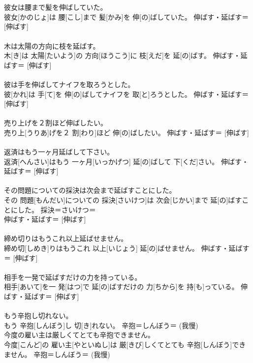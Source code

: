 \documentclass[8pt]{extreport}
\begin{document}
\begin{CJK}{UTF8}{min}
{\\	[晒す] 
\\	彼女は腰まで髪を伸ばしていた。	
\\	彼女[かのじょ]は 腰[こし]まで 髪[かみ]を 伸[の]ばしていた。	伸ばす・延ばす＝ [伸ばす] 
\\	[延ばす] 
\\	木は太陽の方向に枝を延ばす。	
\\	木[き]は 太陽[たいよう]の 方向[ほうこう]に 枝[えだ]を 延[の]ばす。	伸ばす・延ばす＝ [伸ばす] 
\\	[延ばす] 
\\	彼は手を伸ばしてナイフを取ろうとした。	
\\	彼[かれ]は 手[て]を 伸[の]ばしてナイフを 取[と]ろうとした。	伸ばす・延ばす＝ [伸ばす] 
\\	[延ばす] 
\\	売り上げを２割ほど伸ばしたい。	
\\	売り上[うりあ]げを２ 割[わり]ほど 伸[の]ばしたい。	伸ばす・延ばす＝ [伸ばす] 
\\	[延ばす] 
\\	返済はもう一ヶ月延ばして下さい。	
\\	返済[へんさい]はもう 一ヶ月[いっかげつ] 延[の]ばして 下[くだ]さい。	伸ばす・延ばす＝ [伸ばす] 
\\	[延ばす] 
\\	その問題についての採決は次会まで延ばすことにした。	
\\	その 問題[もんだい]についての 採決[さいけつ]は 次会[じかい]まで 延[の]ばすことにした。	採決＝さいけつ＝ 
\\	伸ばす・延ばす＝ [伸ばす] 
\\	[延ばす] 
\\	締め切りはもうこれ以上延ばせません。	
\\	締め切[しめき]りはもうこれ 以上[いじょう] 延[の]ばせません。	伸ばす・延ばす＝ [伸ばす] 
\\	[延ばす] 
\\	相手を一発で延ばすだけの力を持っている。	
\\	相手[あいて]を一 発[はつ]で 延[の]ばすだけの 力[ちから]を 持[も]っている。	伸ばす・延ばす＝ [伸ばす] 
\\	[延ばす] 
\\	もう辛抱し切れない。	
\\	もう 辛抱[しんぼう]し 切[き]れない。	辛抱＝しんぼう＝ (我慢) 
\\	今度の雇い主は厳しくてとても辛抱できません。	
\\	今度[こんど]の 雇い主[やといぬし]は 厳[きび]しくてとても 辛抱[しんぼう]できません。	辛抱＝しんぼう＝ (我慢) 
}
\end{CJK}
\end{document}
